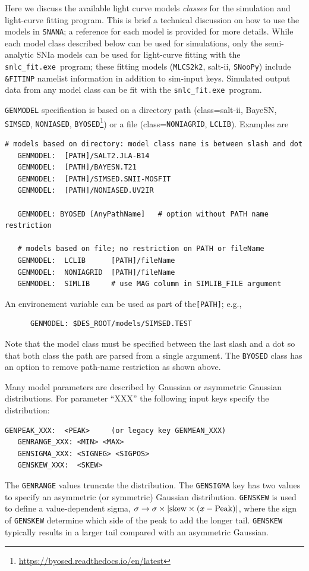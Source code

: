 \documentclass[12pt]{article}
\newcommand{\snfitter}{{\tt snlc\_fit.exe}}
\newcommand{\mlcs}{{\tt MLCS2k2}}
\newcommand{\SALTII}{{\sc salt-ii}}
\newcommand{\BAYESN}{{\sc BayeSN}}
\newcommand{\snoopy}{{\tt SNooPy}}
\newcommand{\SIMSED}{{\tt SIMSED}}
\newcommand{\BYOSED}{{\tt BYOSED}}
\newcommand{\NONIA}{{\tt NONIASED}}
\newcommand{\NONIAGRID}{{\tt NONIAGRID}}
\newcommand{\LCLIB}{{\tt LCLIB}}
\newcommand{\snana}{{\tt SNANA}}
\begin{document}
Here we discuss the available light curve models {\it classes}
for the simulation and light-curve fitting program. 
This is brief a technical discussion on how to use the models in \snana; 
a reference for each model is provided for more details.
While each model class described below can be used for
simulations, only the semi-analytic SNIa models can be
used for light-curve fitting with the \snfitter\ program;
these fitting models (\mlcs, \SALTII, \snoopy) include 
{\tt\&FITINP} namelist information in addition to sim-input keys.
Simulated output data from any model class can be fit with 
the \snfitter\ program.


{\tt GENMODEL} specification is based on a directory path 
(class=\SALTII, \BAYESN, \SIMSED, \NONIA, \BYOSED\footnote{\url{https://byosed.readthedocs.io/en/latest}}) 
or a file (class=\NONIAGRID, \LCLIB).
Examples are

\begin{Verbatim}[frame=single]
   # models based on directory: model class name is between slash and dot
   GENMODEL:  [PATH]/SALT2.JLA-B14
   GENMODEL:  [PATH]/BAYESN.T21    
   GENMODEL:  [PATH]/SIMSED.SNII-MOSFIT
   GENMODEL:  [PATH]/NONIASED.UV2IR

   GENMODEL: BYOSED [AnyPathName]   # option without PATH name restriction

   # models based on file; no restriction on PATH or fileName
   GENMODEL:  LCLIB      [PATH]/fileName
   GENMODEL:  NONIAGRID  [PATH]/fileName
   GENMODEL:  SIMLIB     # use MAG column in SIMLIB_FILE argument
\end{Verbatim}
%
An environement variable can be used as part of the{\tt [PATH]};
e.g., 
\begin{verbatim}
      GENMODEL: $DES_ROOT/models/SIMSED.TEST
\end{verbatim}
%
Note that the model class must be specified between the last slash
and a dot so that both class the path are parsed from a single argument.
The {\tt BYOSED} class has an option to remove path-name restriction
as shown above.


\medskip
Many model parameters are described by Gaussian or asymmetric Gaussian
distributions.  For  parameter ``XXX'' the following input keys
specify the distribution:
\begin{Verbatim}[frame=single]
   GENPEAK_XXX:  <PEAK>     (or legacy key GENMEAN_XXX)
   GENRANGE_XXX: <MIN> <MAX>
   GENSIGMA_XXX: <SIGNEG> <SIGPOS>
   GENSKEW_XXX:  <SKEW>
\end{Verbatim}
%
The {\tt GENRANGE} values truncate the distribution.
The {\tt GENSIGMA} key has two values to specify an 
asymmetric (or symmetric) Gaussian distribution.  
{\tt GENSKEW} is used to define a value-dependent sigma,
$\sigma \to \sigma\times \vert{\rm skew}\times (x - {\rm Peak})\vert$,
where the sign of {\tt GENSKEW} determine which side of
the peak to add the longer tail.
{\tt GENSKEW} typically results in a larger tail compared with
an asymmetric Gaussian.
\end{document}
